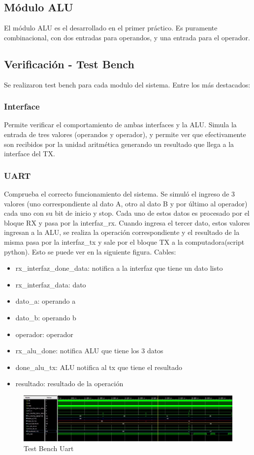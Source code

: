 \documentclass[a4paper]{article}
\begin{document}
\subsection{Módulo ALU}
El módulo ALU es el desarrollado en el primer práctico. Es puramente combinacional, con dos entradas para operandos, y una entrada para el operador.


\subsection{Verificación - Test Bench}
Se realizaron test bench para cada modulo del sistema. Entre los más destacados:

\subsubsection{Interface}
Permite verificar el comportamiento de ambas interfaces y la ALU. Simula la entrada de tres valores (operandos y operador), y permite ver que efectivamente son recibidos por la unidad aritmética generando un resultado que llega a la interface del TX.

\subsubsection{UART}
Comprueba el correcto funcionamiento del sistema. Se simuló el ingreso de 3 valores (uno correspondiente al dato A, otro al dato B y por último al operador) cada uno con su bit de inicio y stop.  Cada uno de estos datos es procesado por el bloque RX y pasa por la interfaz\_rx. Cuando ingresa el tercer dato, estos valores ingresan a la ALU, se realiza la operación correspondiente y el resultado de la misma pasa por la interfaz\_tx y sale por el bloque TX a la computadora(script python).
Esto se puede ver en la siguiente figura. Cables:
\begin{itemize}
\item rx\_interfaz\_done\_data: notifica a la interfaz que tiene un dato listo
\item rx\_interfaz\_data: dato
\item dato\_a: operando a
\item dato\_b: operando b
\item operador: operador
\item rx\_alu\_done: notifica ALU que tiene los 3 datos
\item done\_alu\_tx: ALU notifica al tx que tiene el resultado
\item resultado: resultado de la operación
\end{itemize}
\begin{figure}[!htb]
\centering
\includegraphics[width=1\textwidth]{Tb_uart.jpeg}
\caption{\label{fig:tests}Test Bench Uart}
\end{figure}
\end{document}
